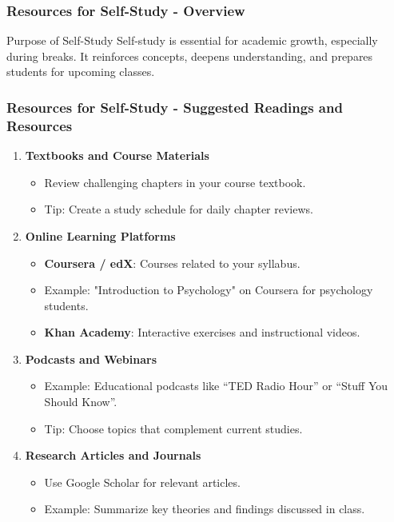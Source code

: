 \documentclass[aspectratio=169]{beamer}
\begin{document}
\begin{frame}[fragile]
    \frametitle{Resources for Self-Study - Overview}
    \begin{block}{Purpose of Self-Study}
        Self-study is essential for academic growth, especially during breaks. It reinforces concepts, deepens understanding, and prepares students for upcoming classes.
    \end{block}
\end{frame}

\begin{frame}[fragile]
    \frametitle{Resources for Self-Study - Suggested Readings and Resources}
    \begin{enumerate}
        \item \textbf{Textbooks and Course Materials}
            \begin{itemize}
                \item Review challenging chapters in your course textbook.
                \item Tip: Create a study schedule for daily chapter reviews.
            \end{itemize}
        
        \item \textbf{Online Learning Platforms}
            \begin{itemize}
                \item \textbf{Coursera / edX}: Courses related to your syllabus.
                \item Example: "Introduction to Psychology" on Coursera for psychology students.
                \item \textbf{Khan Academy}: Interactive exercises and instructional videos.
            \end{itemize}
        
        \item \textbf{Podcasts and Webinars}
            \begin{itemize}
                \item Example: Educational podcasts like “TED Radio Hour” or “Stuff You Should Know”.
                \item Tip: Choose topics that complement current studies.
            \end{itemize}
        
        \item \textbf{Research Articles and Journals}
            \begin{itemize}
                \item Use Google Scholar for relevant articles.
                \item Example: Summarize key theories and findings discussed in class.
            \end{itemize}
        

\end{enumerate}
\end{frame}
\end{document}
